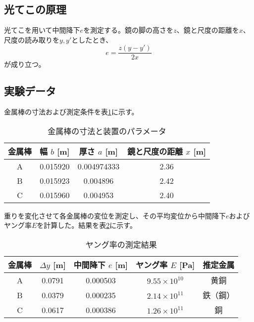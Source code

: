 \documentclass[a4paper,11pt,dvipdfmx]{jsarticle}
\begin{document}
\subsection{光てこの原理}
光てこを用いて中間降下\( e \)を測定する。鏡の脚の高さを\( z \)、鏡と尺度の距離を\( x \)、尺度の読み取りを\( y, y' \)としたとき、
\begin{equation}
e = \frac{z (y - y')}{2x}
\end{equation}
が成り立つ。

\subsection{実験データ}
金属棒の寸法および測定条件を表\ref{tbl:specs}に示す。

\renewcommand{\arraystretch}{1.2}
\begin{table}[H]
\centering
\caption{金属棒の寸法と装置のパラメータ}
\label{tbl:specs}
\begin{tabular}{|c|c|c|c|}
\hline
金属棒 & 幅 \( b \) [m] & 厚さ \( a \) [m] & 鏡と尺度の距離 \( x \) [m] \\ \hline
A & 0.015920 & 0.004974333 & 2.36 \\ \hline
B & 0.015923 & 0.004896     & 2.42 \\ \hline
C & 0.015960 & 0.004953     & 2.40 \\ \hline
\end{tabular}
\end{table}

重りを変化させて各金属棒の変位を測定し、その平均変位から中間降下\( e \)およびヤング率\( E \)を計算した。結果を表\ref{tbl:young}に示す。

\begin{table}[H]
\centering
\caption{ヤング率の測定結果}
\label{tbl:young}
\begin{tabular}{|c|c|c|c|c|}
\hline
金属棒 & \( \Delta y \) [m] & 中間降下 \( e \) [m] & ヤング率 \( E \) [Pa] & 推定金属 \\ \hline
A & 0.0791 & 0.000503 & \( 9.55 \times 10^{10} \) & 黄銅 \\ \hline
B & 0.0379 & 0.000235 & \( 2.14 \times 10^{11} \) & 鉄（鋼） \\ \hline
C & 0.0617 & 0.000386 & \( 1.26 \times 10^{11} \) & 銅 \\ \hline
\end{tabular}
\end{table}
\end{document}
